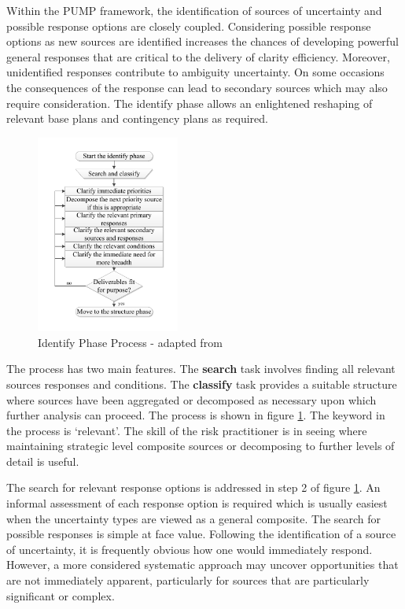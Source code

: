 Within the PUMP framework, the identification of sources of uncertainty and possible response options are closely coupled. 
Considering possible response options as new sources are identified increases the chances of developing powerful general responses that are critical to the delivery of clarity efficiency. 
Moreover, unidentified responses contribute to ambiguity uncertainty. 
On some occasions the consequences of the response can lead to secondary sources which may also require consideration.
The identify phase allows an enlightened reshaping of relevant base plans and contingency plans as required.

\begin{figure}[!h]
  \centering
    \includegraphics[width = 0.42\textwidth]{./Figures/Identify.pdf} 
\caption{Identify Phase Process - adapted from \cite{chapman}}
\label{Figure:Identify}
\end{figure}

The process has two main features. 
The \textbf{search} task involves finding all relevant sources responses and conditions. 
The \textbf{classify} task provides a suitable structure where sources have been aggregated or decomposed as necessary upon which further analysis can proceed.
The process is shown in figure \ref{Figure:Identify}.
The keyword in the process is `relevant'. 
The skill of the risk practitioner is in seeing where maintaining strategic level composite sources or decomposing to further levels of detail is useful.

The search for relevant response options is addressed in step 2 of figure \ref{Figure:Identify}.
An informal assessment of each response option is required which is usually easiest when the uncertainty types are viewed as a general composite.
The search for possible responses is simple at face value.
Following the identification of a source of uncertainty, it is frequently obvious how one would immediately respond.
However, a more considered systematic approach may uncover opportunities that are not immediately apparent, particularly for sources that are particularly significant or complex.

